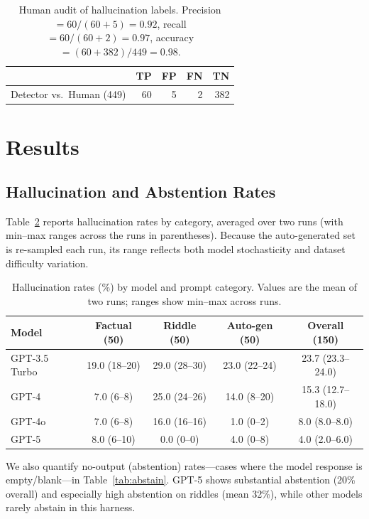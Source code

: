 \documentclass[11pt]{article}
\begin{document}
\begin{table}[t]
\centering
\begin{tabular}{lrrrr}
\toprule
 & TP & FP & FN & TN \\
\midrule
Detector vs.\ Human (449) & 60 & 5 & 2 & 382 \\
\bottomrule
\end{tabular}
\caption{Human audit of hallucination labels. Precision $=60/(60+5)=0.92$, recall $=60/(60+2)=0.97$, accuracy $=(60+382)/449=0.98$.}
\label{tab:audit}
\end{table}

\section{Results}
\subsection{Hallucination and Abstention Rates}
Table~\ref{tab:hallu_rates} reports hallucination rates by category, averaged over two runs (with min--max ranges across the runs in parentheses). Because the auto-generated set is re-sampled each run, its range reflects both model stochasticity and dataset difficulty variation.

\begin{table}[t]
\centering
\begin{tabular}{lcccc}
\toprule
Model & Factual (50) & Riddle (50) & Auto-gen (50) & Overall (150) \\
\midrule
GPT-3.5 Turbo & 19.0 (18--20) & 29.0 (28--30) & 23.0 (22--24) & 23.7 (23.3--24.0) \\
GPT-4 & 7.0 (6--8) & 25.0 (24--26) & 14.0 (8--20) & 15.3 (12.7--18.0) \\
GPT-4o & 7.0 (6--8) & 16.0 (16--16) & 1.0 (0--2) & 8.0 (8.0--8.0) \\
GPT-5 & 8.0 (6--10) & 0.0 (0--0) & 4.0 (0--8) & 4.0 (2.0--6.0) \\
\bottomrule
\end{tabular}
\caption{Hallucination rates (\%) by model and prompt category. Values are the mean of two runs; ranges show min--max across runs.}
\label{tab:hallu_rates}
\end{table}

We also quantify no-output (abstention) rates---cases where the model response is empty/blank---in Table~\ref{tab:abstain}. GPT-5 shows substantial abstention (20\% overall) and especially high abstention on riddles (mean 32\%), while other models rarely abstain in this harness.
\end{document}
